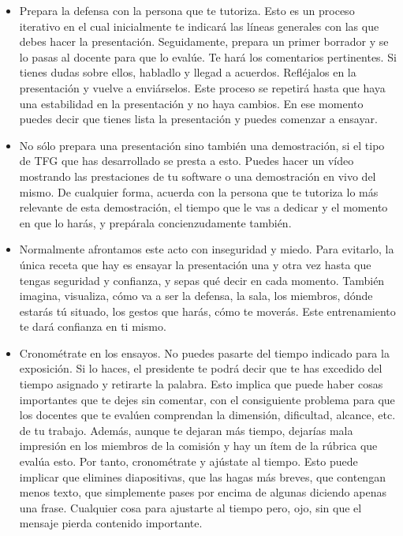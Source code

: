 \begin{itemize}

    \item Prepara la defensa con la persona que te tutoriza. Esto es un proceso iterativo en el cual inicialmente te indicará las líneas generales con las que debes hacer la presentación. Seguidamente, prepara un primer borrador y se lo pasas al docente para que lo evalúe. Te hará los comentarios pertinentes. Si tienes dudas sobre ellos, habladlo y llegad a acuerdos. Refléjalos en la presentación y vuelve a enviárselos. Este proceso se repetirá hasta que haya una estabilidad en la presentación y no haya cambios. En ese momento puedes decir que tienes lista la presentación y puedes comenzar a ensayar.

    \item No sólo prepara una presentación sino también una demostración, si el tipo de TFG que has desarrollado se presta a esto. Puedes hacer un vídeo mostrando las prestaciones de tu software o una demostración en vivo del mismo. De cualquier forma, acuerda con la persona que te tutoriza lo más relevante de esta demostración, el tiempo que le vas a dedicar y el momento en que lo harás, y prepárala concienzudamente también. 

    \item Normalmente afrontamos este acto con inseguridad y miedo. Para evitarlo, la única receta que hay es ensayar la presentación una y otra vez hasta que tengas seguridad y confianza, y sepas qué decir en cada momento. También imagina, visualiza, cómo va a ser la defensa, la sala, los miembros, dónde estarás tú situado, los gestos que harás, cómo te moverás. Este entrenamiento te dará confianza en ti mismo.

    \item Cronométrate en los ensayos. No puedes pasarte del tiempo indicado para la exposición. Si lo haces, el presidente te podrá decir que te has excedido del tiempo asignado y retirarte la palabra. Esto implica que puede haber cosas importantes que te dejes sin comentar, con el consiguiente problema para que los docentes que te evalúen comprendan la dimensión, dificultad, alcance, etc. de tu trabajo. Además, aunque te dejaran más tiempo, dejarías mala impresión en los miembros de la comisión y hay un ítem de la rúbrica que evalúa esto. Por tanto, cronométrate y ajústate al tiempo. Esto puede implicar que elimines diapositivas, que las hagas más breves, que contengan menos texto, que simplemente pases por encima de algunas diciendo apenas una frase. Cualquier cosa para ajustarte al tiempo pero, ojo, sin que el mensaje pierda contenido importante.


\end{itemize}
